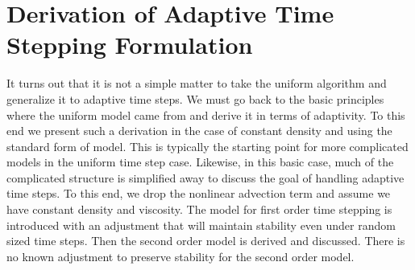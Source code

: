\documentclass[letterpaper]{erdc}
\begin{document}
\section{Derivation of Adaptive Time Stepping Formulation}\label{sec:VariableTimeSteppingAppendix}
It turns out that it is not a simple matter to take the uniform algorithm and generalize it to adaptive time steps.  We must go back to the basic principles where the uniform model came from and derive it in terms of adaptivity.  To this end we present such a derivation in the case of constant density and using the standard form of model.  This is typically the starting point for more complicated models in the uniform time step case.  Likewise, in this basic case, much of the complicated structure is simplified away to discuss the goal of handling adaptive time steps.  To this end, we drop the nonlinear advection term and assume we have constant density and viscosity.  The model for first order time stepping is introduced with an adjustment that will maintain stability even under random sized time steps.  Then the second order model is derived and discussed.  There is no known adjustment to preserve stability for the second order model.


%
%
\end{document}
